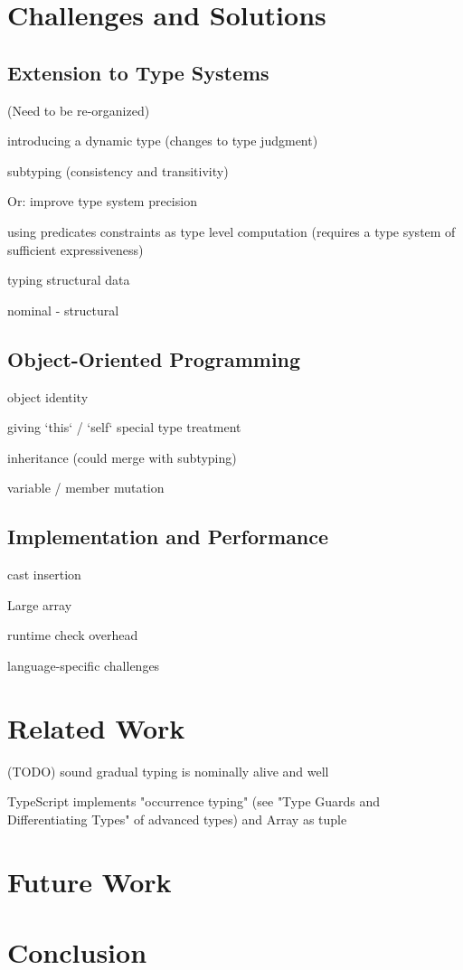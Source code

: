 
\renewcommand{\thechapter}{3}

\chapter{Challenges and Solutions}

\section{Extension to Type Systems}

(Need to be re-organized)

introducing a dynamic type (changes to type judgment)

subtyping (consistency and transitivity)

Or: improve type system precision

using predicates
constraints as type level computation (requires a type system of sufficient expressiveness)

typing structural data

nominal
- structural

\section{Object-Oriented Programming}

object identity

giving `this` / `self` special type treatment

inheritance (could merge with subtyping)

variable / member mutation

\section{Implementation and Performance}

cast insertion

Large array

runtime check overhead

language-specific challenges

\renewcommand{\thechapter}{4}
\chapter{Related Work}

(TODO) sound gradual typing is nominally alive and well


TypeScript implements "occurrence typing" (see "Type Guards and Differentiating Types" of advanced types) and Array as tuple 
\renewcommand{\thechapter}{5}

\chapter{Future Work}

\renewcommand{\thechapter}{6}
\chapter{Conclusion}